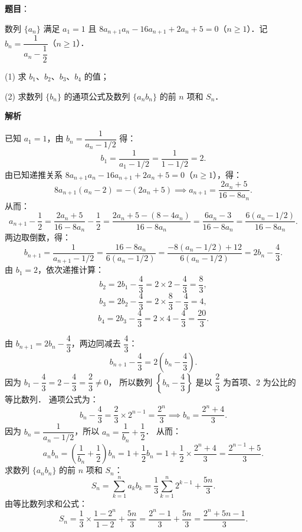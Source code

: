 \begin{answer}

\textbf{题目}：

数列 $\{a_n\}$ 满足 $a_1 = 1$ 且 $8a_{n+1} a_n - 16a_{n+1} + 2a_n + 5 = 0$（$n \geqslant 1$）．记 $b_n = \dfrac{1}{a_n - \dfrac{1}{2}}$（$n \geqslant 1$）．

(1) 求 $b_1$、$b_2$、$b_3$、$b_4$ 的值；

(2) 求数列 $\{b_n\}$ 的通项公式及数列 $\{a_n b_n\}$ 的前 $n$ 项和 $S_n$．

\textbf{解析}


已知 $a_1 = 1$，由 $b_n = \dfrac{1}{a_n - 1/2}$ 得：
\nopagebreak[4]
\[
b_1 = \frac{1}{a_1 - 1/2} = \frac{1}{1 - 1/2} = 2.
\]
由已知递推关系 $8a_{n+1} a_n - 16a_{n+1} + 2a_n + 5 = 0$（$n \geqslant 1$），得：
\nopagebreak[4]
\[
8a_{n+1}(a_n - 2) = -(2a_n + 5) \implies a_{n+1} = \frac{2a_n + 5}{16 - 8a_n}.
\]
从而：
\nopagebreak[4]
\[
a_{n+1} - \frac{1}{2} = \frac{2a_n + 5}{16 - 8a_n} - \frac{1}{2} = \frac{2a_n + 5 - (8 - 4a_n)}{16 - 8a_n} = \frac{6a_n - 3}{16 - 8a_n} = \frac{6(a_n - 1/2)}{16 - 8a_n}.
\]
两边取倒数，得：
\nopagebreak[4]
\[
b_{n+1} = \frac{1}{a_{n+1} - 1/2} = \frac{16 - 8a_n}{6(a_n - 1/2)} = \frac{-8(a_n - 1/2) + 12}{6(a_n - 1/2)} = 2b_n - \frac{4}{3}.
\]
由 $b_1 = 2$，依次递推计算：
\nopagebreak[4]
\[
b_2 = 2b_1 - \frac{4}{3} = 2 \times 2 - \frac{4}{3} = \frac{8}{3},
\]
\nopagebreak[4]
\[
b_3 = 2b_2 - \frac{4}{3} = 2 \times \frac{8}{3} - \frac{4}{3} = 4,
\]
\nopagebreak[4]
\[
b_4 = 2b_3 - \frac{4}{3} = 2 \times 4 - \frac{4}{3} = \frac{20}{3}.
\]


由 $b_{n+1} = 2b_n - \dfrac{4}{3}$，两边同减去 $\dfrac{4}{3}$：
\nopagebreak[4]
\[
b_{n+1} - \frac{4}{3} = 2\left(b_n - \frac{4}{3}\right).
\]
因为 $b_1 - \dfrac{4}{3} = 2 - \dfrac{4}{3} = \dfrac{2}{3} \neq 0$，
所以数列 $\left\{b_n - \dfrac{4}{3}\right\}$ 是以 $\dfrac{2}{3}$ 为首项、2 为公比的等比数列．
通项公式为：
\nopagebreak[4]
\[
b_n - \frac{4}{3} = \frac{2}{3} \times 2^{n-1} = \frac{2^n}{3} \implies b_n = \frac{2^n + 4}{3}.
\]
因为 $b_n = \dfrac{1}{a_n - 1/2}$，所以 $a_n = \dfrac{1}{b_n} + \dfrac{1}{2}$．
从而：
\nopagebreak[4]
\[
a_n b_n = \left(\frac{1}{b_n} + \frac{1}{2}\right) b_n = 1 + \frac{1}{2}b_n = 1 + \frac{1}{2} \times \frac{2^n + 4}{3} = \frac{2^{n-1} + 5}{3}.
\]
求数列 $\{a_n b_n\}$ 的前 $n$ 项和 $S_n$：
\nopagebreak[4]
\[
S_n = \sum_{k=1}^n a_k b_k = \frac{1}{3} \sum_{k=1}^n 2^{k-1} + \frac{5n}{3}.
\]
由等比数列求和公式：
\nopagebreak[4]
\[
S_n = \frac{1}{3} \times \frac{1 - 2^n}{1 - 2} + \frac{5n}{3} = \frac{2^n - 1}{3} + \frac{5n}{3} = \frac{2^n + 5n - 1}{3}.
\]



\end{answer}
